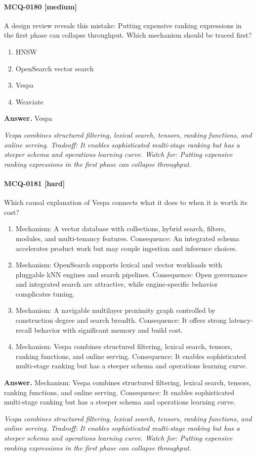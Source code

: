 \paragraph{MCQ-0180 [medium]} A design review reveals this mistake: Putting expensive ranking expressions in the first phase can collapse throughput. Which mechanism should be traced first?
\begin{enumerate}[label=\Alph*.]
\item HNSW
\item OpenSearch vector search
\item Vespa
\item Weaviate
\end{enumerate}
\noindent\textbf{Answer.} Vespa
\par\textit{Vespa combines structured filtering, lexical search, tensors, ranking functions, and online serving. Tradeoff: It enables sophisticated multi-stage ranking but has a steeper schema and operations learning curve. Watch for: Putting expensive ranking expressions in the first phase can collapse throughput.}
\paragraph{MCQ-0181 [hard]} Which causal explanation of Vespa connects what it does to when it is worth its cost?
\begin{enumerate}[label=\Alph*.]
\item Mechanism: A vector database with collections, hybrid search, filters, modules, and multi-tenancy features. Consequence: An integrated schema accelerates product work but may couple ingestion and inference choices.
\item Mechanism: OpenSearch supports lexical and vector workloads with pluggable kNN engines and search pipelines. Consequence: Open governance and integrated search are attractive, while engine-specific behavior complicates tuning.
\item Mechanism: A navigable multilayer proximity graph controlled by construction degree and search breadth. Consequence: It offers strong latency-recall behavior with significant memory and build cost.
\item Mechanism: Vespa combines structured filtering, lexical search, tensors, ranking functions, and online serving. Consequence: It enables sophisticated multi-stage ranking but has a steeper schema and operations learning curve.
\end{enumerate}
\noindent\textbf{Answer.} Mechanism: Vespa combines structured filtering, lexical search, tensors, ranking functions, and online serving. Consequence: It enables sophisticated multi-stage ranking but has a steeper schema and operations learning curve.
\par\textit{Vespa combines structured filtering, lexical search, tensors, ranking functions, and online serving. Tradeoff: It enables sophisticated multi-stage ranking but has a steeper schema and operations learning curve. Watch for: Putting expensive ranking expressions in the first phase can collapse throughput.}
